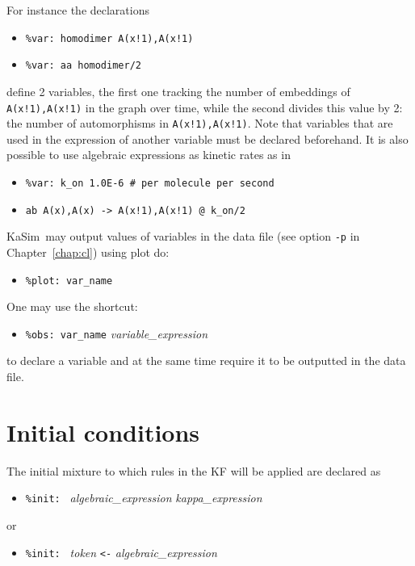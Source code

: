 \documentclass[11pt]{book}
\def\KaSim{\textsf{KaSim}}
\def\ttt#1{\texttt{#1}}
\def\var#1{\textquotesingle #1\textquotesingle}
\def\noi{\noindent}
\def\ITE#1{\begin{itemize}#1\end{itemize}}
\begin{document}
\noi For instance the declarations
\ITE{
\item[] \ttt{\%var: \var{homodimer}~A(x!1),A(x!1)}
\item[] \ttt{\%var: \var{aa}~\var{homodimer}/2}
}
define 2 variables, the first one tracking the number of embeddings of \ttt{A(x!1),A(x!1)} in the graph over time, while the second divides this value by 2: the number of automorphisms in \ttt{A(x!1),A(x!1)}. Note that variables that are used in the expression of another variable must be declared beforehand. 
\vskip 0.25cm
\noi It is also possible to use algebraic expressions as kinetic rates as in
\ITE{
\item[] \ttt{\%var: \var{k\_on}~1.0E-6 \# per molecule per second}
\item[] \ttt{\var{ab}~A(x),A(x) -> A(x!1),A(x!1) @ \var{k\_on}/2}
}
\KaSim~may output values of variables in the data file (see option \ttt{-p} in Chapter~\ref{chap:cl}) using plot do:
\ITE{
\item[] \ttt{\%plot: \textquotesingle var\_name\textquotesingle }
}
One may use the shortcut: 
\ITE{
\item[] \ttt{\%obs: \textquotesingle var\_name\textquotesingle  } \textit{variable\_expression}
}
to declare a variable and at the same time require it to be outputted in the data file. 

\section{Initial conditions}\label{sec:init}

The initial mixture to which rules in the KF will be applied are declared as
\ITE{
\item[] \ttt{\%init: } \textit{algebraic\_expression} \textit{kappa\_expression}
}
or
\ITE{
\item[] \ttt{\%init: }  \textit{token} \ttt{<-} \textit{algebraic\_expression}
}
\end{document}
